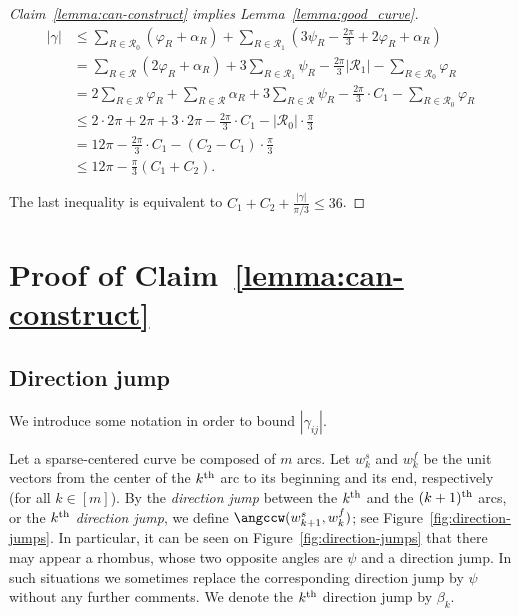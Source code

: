 \begin{proof}[Claim~\ref{lemma:can-construct} implies Lemma~\ref{lemma:good_curve}]
\begin{align*}
    |\gamma| &\leq \sum_{R\in\mathcal{R}_0}(\varphi_R + \alpha_R) + \sum_{R\in\mathcal{R}_1}\left(3\psi_R - \frac{2\pi}{3} + 2\varphi_R + \alpha_R\right)  \\
    &= \sum_{R\in\mathcal{R}}(2\varphi_R + \alpha_R) + 3\sum_{R\in\mathcal{R}_1}\psi_R - \frac{2\pi}{3}|\mathcal{R}_1| - \sum_{R\in\mathcal{R}_0}\varphi_R  \\
    &= 2\sum_{R\in\mathcal{R}}\varphi_R + \sum_{R\in\mathcal{R}}\alpha_R + 3\sum_{R\in\mathcal{R}}\psi_R - \frac{2\pi}{3}\cdot C_1 - \sum_{R\in\mathcal{R}_0}\varphi_R  \\
    &\leq 2\cdot 2\pi + 2\pi + 3\cdot 2\pi - \frac{2\pi}{3}\cdot C_1 - |\mathcal{R}_0|\cdot\frac{\pi}{3}  \\
    &= 12\pi - \frac{2\pi}{3}\cdot C_1 - (C_2 - C_1)\cdot\frac{\pi}{3}  \\
    &\leq 12\pi - \frac{\pi}{3}(C_1 + C_2).
\end{align*}

The last inequality is equivalent to $C_1 + C_2 + \frac{|\gamma|}{\pi/3}\leq 36$.
\end{proof}

\section{Proof of Claim~\ref{lemma:can-construct}}

\subsection{Direction jump}

We introduce some notation in order to bound $|\gamma_{ij}|$.

Let a sparse-centered curve be composed of $m$ arcs. Let $w_k^s$ and $w_k^f$ be the unit vectors from the center of the $k\textsuperscript{th}$ arc to its beginning and its end, respectively (for all $k\in[m]$). By the \emph{direction jump} between the $k\textsuperscript{th}$ and the $(k+1)\textsuperscript{th}$ arcs, or the \emph{$k\textsuperscript{th}$ direction jump}, we define $\angccw(w_{k+1}^s, w_k^f)$; see Figure~\ref{fig:direction-jumps}. In particular, it can be seen on Figure~\ref{fig:direction-jumps} that there may appear a rhombus, whose two opposite angles are $\psi$ and a direction jump. In such situations we sometimes replace the corresponding direction jump by $\psi$ without any further comments. We denote the $k\textsuperscript{th}$ direction jump by $\beta_k$.

